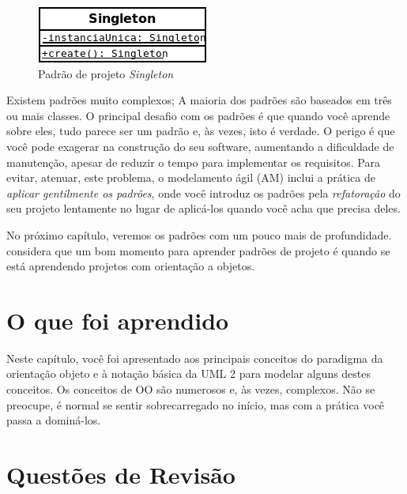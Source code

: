 \documentclass[
	11pt,				%
	openright,
	twoside,			%
	a4paper,			%
	english,			%
	french,
	brazil,				%
	sumario=tradicional
	]{abntex2}
\begin{document}
\begin{figure}
\begin{center}
\includegraphics[scale=0.7]{singleton.png}
\end{center}
\caption{Padrão de projeto \emph{Singleton}} \label{fig:singleton}
\end{figure}

Existem padrões muito complexos; A maioria dos padrões são baseados em três ou mais classes. O principal desafio com os padrões é que quando você aprende sobre eles, tudo parece ser um padrão e, às vezes, isto é verdade. O perigo é que você pode exagerar na construção do seu software, aumentando a dificuldade de manutenção, apesar de reduzir o tempo para implementar os requisitos. Para evitar, atenuar, este problema, o modelamento ágil (AM) inclui a prática de \emph{aplicar gentilmente os padrões}, onde você introduz os padrões pela \emph{refatoração} do seu projeto lentamente no lugar de aplicá-los quando você acha que precisa deles.

No próximo capítulo, veremos os padrões com um pouco mais de profundidade.  considera que um bom momento para aprender padrões de projeto é quando se está aprendendo projetos com orientação a objetos.

\section{O que foi aprendido}

Neste capítulo, você foi apresentado aos principais conceitos do paradigma da orientação objeto e à notação básica da UML 2 para modelar alguns destes conceitos. Os conceitos de OO são numerosos e, às vezes, complexos. Não se preocupe, é normal se sentir sobrecarregado no início, mas com a prática você passa a dominá-los. 

\section{Questões de Revisão}
\end{document}
